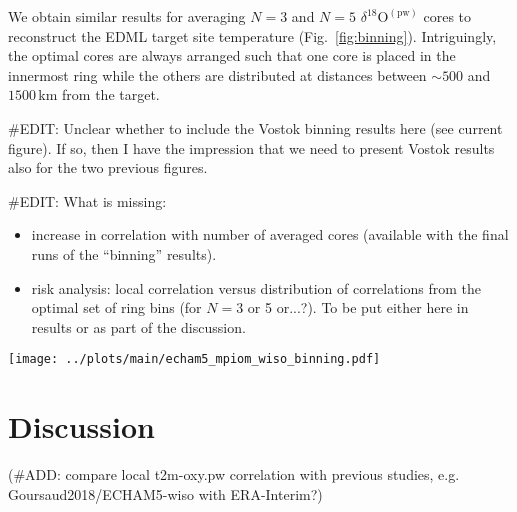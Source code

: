 \documentclass[cp, manuscript]{copernicus}
\begin{document}
We obtain similar results for averaging $N=3$ and $N=5$
$\delta^{18}\mathrm{O}^{\mathrm{(pw)}}$ cores to reconstruct the EDML target
site temperature (Fig.~\ref{fig:binning}). Intriguingly, the optimal cores are
always arranged such that one core is placed in the innermost ring while the
others are distributed at distances between $\sim500$ and $1500$\,km from the
target.

\noindent
\#EDIT: Unclear whether to include the Vostok binning results here (see current
figure). If so, then I have the impression that we need to present Vostok
results also for the two previous figures.

\noindent
\#EDIT: What is missing:
\begin{itemize}
\item increase in correlation with number of averaged cores (available with the
  final runs of the ``binning'' results).
\item risk analysis: local correlation versus distribution of correlations from
  the optimal set of ring bins (for $N=3$ or 5 or...?). To be put either here in
  results or as part of the discussion.
\end{itemize}

\begin{figure*}[t]%
\centering
\texttt{[image: ../plots/main/echam5\_mpiom\_wiso\_binning.pdf]}
\caption{%
  The optimal arrangement of averaging three or five
  $\delta^{18}\mathrm{O}^{\mathrm{(pw)}}$ cores to reconstruct the target site
  temperature at EDML (\textbf{a}, \textbf{c}) and Vostok (\textbf{b},
  \textbf{d}). Displayed are the optimal five of all possible combinations of
  ring bins, i.e. those which exhibit the highest mean correlation across $1000$
  (\#EDIT: to be increased) random trials of averaging $N=3$ (\textbf{c},
  \textbf{d}) or $N=5$ (\textbf{a}, \textbf{b}) grid cells from these
  rings. \#EDIT: the figure could also be done for the average across target
  sites in the \emph{regions} DML and Vostok.}
\label{fig:binning}%
\end{figure*}%

\section{Discussion}\label{discussion}

(\#ADD: compare local t2m-oxy.pw correlation with previous studies,
e.g. Goursaud2018/ECHAM5-wiso with ERA-Interim?)
\end{document}
